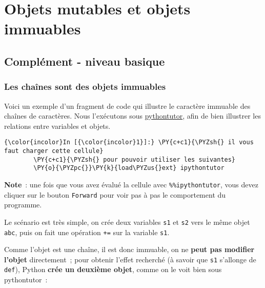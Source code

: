     
    
    
    

    

    \hypertarget{objets-mutables-et-objets-immuables}{%
\section{Objets mutables et objets
immuables}\label{objets-mutables-et-objets-immuables}}

    \hypertarget{compluxe9ment---niveau-basique}{%
\subsection{Complément - niveau
basique}\label{compluxe9ment---niveau-basique}}

    \hypertarget{les-chauxeenes-sont-des-objets-immuables}{%
\subsubsection{Les chaînes sont des objets
immuables}\label{les-chauxeenes-sont-des-objets-immuables}}

    Voici un exemple d'un fragment de code qui illustre le caractère
immuable des chaînes de caractères. Nous l'exécutons sous
\href{pythontutor.com}{pythontutor}, afin de bien illustrer les
relations entre variables et objets.

    \begin{Verbatim}[commandchars=\\\{\}]
{\color{incolor}In [{\color{incolor}1}]:} \PY{c+c1}{\PYZsh{} il vous faut charger cette cellule}
        \PY{c+c1}{\PYZsh{} pour pouvoir utiliser les suivantes}
        \PY{o}{\PYZpc{}}\PY{k}{load\PYZus{}ext} ipythontutor
\end{Verbatim}


    \textbf{Note}~: une fois que vous avez évalué la cellule avec
\texttt{\%\%ipythontutor}, vous devez cliquer sur le bouton
\texttt{Forward} pour voir pas à pas le comportement du programme.

    Le scénario est très simple, on crée deux variables \texttt{s1} et
\texttt{s2} vers le même objet
\texttt{\textquotesingle{}abc\textquotesingle{}}, puis on fait une
opération \texttt{+=} sur la variable \texttt{s1}.

Comme l'objet est une chaîne, il est donc immuable, on ne \textbf{peut
pas modifier l'objet} directement~; pour obtenir l'effet recherché (à
savoir que \texttt{s1} s'allonge de
\texttt{\textquotesingle{}def\textquotesingle{}}), Python \textbf{crée
un deuxième objet}, comme on le voit bien sous pythontutor~:

